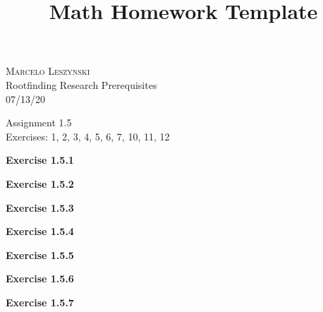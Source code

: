 \documentclass[12pt,oneside]{article}
\newenvironment{exercise}[1]{\vspace{.1in}\noindent\textbf{Exercise #1 \hspace{.05em}}}{}
\begin{document}
\title{Math Homework Template}

\begin{flushright}
\textsc{Marcelo Leszynski}  \\
Rootfinding Research Prerequisites\\
07/13/20
\end{flushright}

\begin{center}
\textsf{Assignment 1.5 } \\
\textsf{Exercises: 1, 2, 3, 4, 5, 6, 7, 10, 11, 12 }
\end{center}


\begin{exercise}{1.5.1}

\end{exercise}


\begin{exercise}{1.5.2}

\end{exercise}


\begin{exercise}{1.5.3}

\end{exercise}


\begin{exercise}{1.5.4}

\end{exercise}


\begin{exercise}{1.5.5}

\end{exercise}


\begin{exercise}{1.5.6}

\end{exercise}


\begin{exercise}{1.5.7}

\end{exercise}
\end{document}
